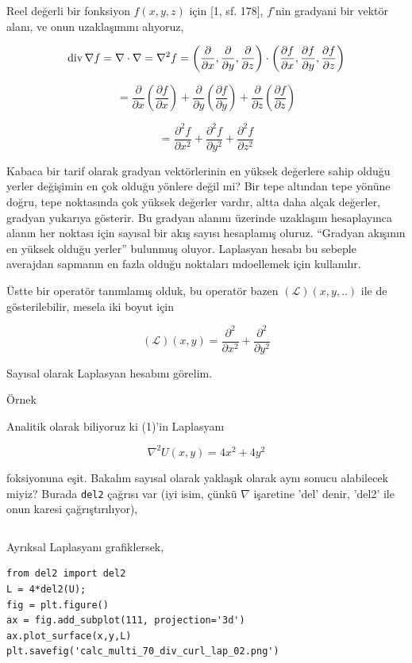\documentclass[12pt,fleqn]{article}\usepackage{../../common}
\begin{document}
Reel değerli bir fonksiyon $f(x,y,z)$ için [1, sf. 178], $f$'nin gradyani bir
vektör alanı, ve onun uzaklaşımını alıyoruz,

$$
\operatorname{div} \nabla f = \nabla \cdot \nabla = \nabla^2 f =
\left(
\frac{\partial }{\partial x},
\frac{\partial }{\partial y},
\frac{\partial }{\partial z} 
\right) \cdot
\left(
\frac{\partial f}{\partial x},
\frac{\partial f}{\partial y},
\frac{\partial f}{\partial z} 
\right)
$$

$$
= \frac{\partial }{\partial x}\left(\frac{\partial f}{\partial x}\right)+
\frac{\partial }{\partial y}\left(\frac{\partial f}{\partial y}\right)+
\frac{\partial }{\partial z}\left(\frac{\partial f}{\partial z}\right)
$$

$$
= \frac{\partial^2 f}{\partial x^2} +
\frac{\partial^2 f}{\partial y^2} +
\frac{\partial^2 f}{\partial z^2} 
$$

Kabaca bir tarif olarak gradyan vektörlerinin en yüksek değerlere sahip olduğu
yerler değişimin en çok olduğu yönlere değil mi? Bir tepe altından tepe yönüne
doğru, tepe noktasında çok yüksek değerler vardır, altta daha alçak değerler,
gradyan yukarıya gösterir. Bu gradyan alanını üzerinde uzaklaşım hesaplayınca
alanın her noktası için sayısal bir akış sayısı hesaplamış oluruz. ``Gradyan
akışının en yüksek olduğu yerler'' bulunmuş oluyor. Laplasyan hesabı bu sebeple
averajdan sapmanın en fazla olduğu noktaları mdoellemek için kullanılır.

Üstte bir operatör tanımlamış olduk, bu operatör bazen $(\mathcal{L})(x,y,..)$
ile de gösterilebilir, mesela iki boyut için

$$
(\mathcal{L})(x,y) =
\frac{\partial^2 }{\partial x^2} + 
\frac{\partial^2 }{\partial y^2} 
$$

Sayısal olarak Laplasyan hesabını görelim.

Örnek

Analitik olarak biliyoruz ki (1)'in Laplasyanı

$$
\nabla^2 U(x,y) = 4 x^2 + 4 y^2
$$

foksiyonuna eşit. Bakalım sayısal olarak yaklaşık olarak aynı sonucu alabilecek
miyiz? Burada \verb!del2! çağrısı var (iyi isim, çünkü $\nabla$ işaretine 'del'
denir, 'del2' ile onun karesi çağrıştırılıyor),

\inputminted[fontsize=\footnotesize]{python}{del2.py}

Ayrıksal Laplasyanı grafiklersek,

\begin{verbatim}
from del2 import del2
L = 4*del2(U);
fig = plt.figure()
ax = fig.add_subplot(111, projection='3d')
ax.plot_surface(x,y,L)
plt.savefig('calc_multi_70_div_curl_lap_02.png')
\end{verbatim}
\end{document}
